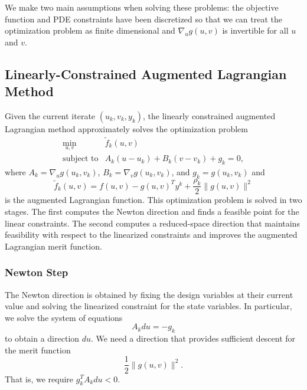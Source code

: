 We make two main assumptions when solving these problems: the 
objective function and PDE constraints 
have been discretized so that we can treat the optimization problem 
as finite dimensional and $\nabla_u g(u,v)$ is invertible for all 
$u$ and $v$.

\subsection{Linearly-Constrained Augmented Lagrangian Method}
Given the current iterate $(u_k, v_k, y_k)$, the linearly constrained
augmented Lagrangian method approximately solves the optimization 
problem
\[
\begin{array}{ll}
\displaystyle \min_{u,v} & \tilde{f}_k(u, v) \\
\mbox{subject to} & A_k (u-u_k) + B_k (v-v_k) + g_k = 0,
\end{array}
\]
where $A_k = \nabla_u g(u_k,v_k)$, $B_k = \nabla_v g(u_k,v_k)$, and
$g_k = g(u_k, v_k)$ and 
\[
\tilde{f}_k(u,v) = f(u,v) - g(u,v)^T y^k + \frac{\rho_k}{2} \| g(u,v) \|^2
\]
is the augmented Lagrangian function.  This optimization problem is
solved in two stages.  The first computes the Newton direction and
finds a feasible point for the linear constraints.  The second 
computes a reduced-space direction that maintains feasibility
with respect to the linearized constraints and improves the
augmented Lagrangian merit function.

\subsubsection{Newton Step}

The Newton direction is obtained by fixing the design variables at
their current value and solving the linearized constraint for the
state variables.  In particular, we solve the system of equations
\[
A_k du = -g_k
\]
to obtain a direction $du$.  We need a direction that provides
sufficient descent for the merit function
\[
  \frac{1}{2} \|g(u,v)\|^2.
\]
That is, we require $g_k^T A_k du < 0$.  

